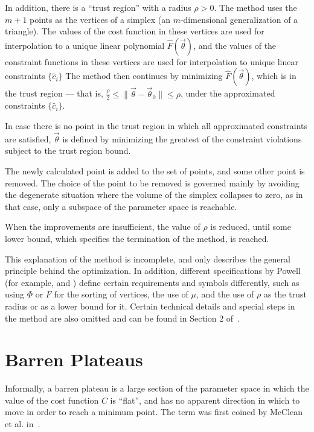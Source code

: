 \documentclass[a4paper,12pt]{article}
\newcommand{\thetas}{\vec{\theta}}
\begin{document}
In addition, there is a ``trust region'' with a radius $\rho>0$. The method uses the $m+1$ points as the vertices of a simplex (an $m$-dimensional generalization of a triangle).
The values of the cost function in these vertices are used for interpolation to a unique linear polynomial $\hat{F}(\thetas)$, and the values of the constraint functions in these vertices are used for interpolation to unique linear constraints $\{\hat{c}_i\}$
The method then continues by minimizing $\hat{F}(\thetas)$, which is in the trust region --- that is, $\frac{\rho}{2} \leq \|\thetas - \thetas_0\| \leq \rho$, under the approximated constraints $\{\hat{c}_i\}$.

In case there is no point in the trust region in which all approximated constraints are satisfied, $\thetas$ is defined by minimizing the greatest of the constraint violations subject to the trust region bound.

The newly calculated point is added to the set of points, and some other point is removed.
The choice of the point to be removed is governed mainly by avoiding the degenerate situation where the volume of the simplex collapses to zero, as in that case, only a subspace of the parameter space is reachable.

When the improvements are insufficient, the value of $\rho$ is reduced, until some lower bound, which specifies the termination of the method, is reached.

This explanation of the method is incomplete, and only describes the general principle behind the optimization. In addition, different specifications by Powell (for example, \cite{Powell1994} and \cite{powell_view_2007}) define certain requirements and symbols differently, such as using $\Phi$ or $F$ for the sorting of vertices, the use of $\mu$, and the use of $\rho$ as the trust radius or as a lower bound for it.
Certain technical details and special steps in the method are also omitted and can be found in Section 2 of~\cite{Powell1994}.


\section{Barren Plateaus} \label{sec:bps}
Informally, a barren plateau is a large section of the parameter space in which the value of the cost function $C$ is ``flat'', and has no apparent direction in which to move in order to reach a minimum point. The term was first coined by McClean et al. in~\cite{mcclean_barren_2018}.
\end{document}
